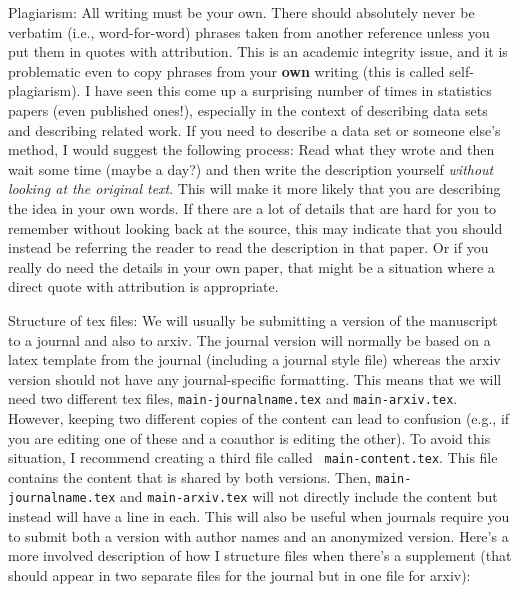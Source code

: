 \documentclass[11pt]{article}
\begin{document}
\begin{todolist}
\begin{todolist}
  \end{todolist}
\item Plagiarism:  All writing must be your own.  There should
  absolutely never be verbatim (i.e., word-for-word) phrases taken
  from another reference unless you put them in quotes with
  attribution.  This is an academic integrity issue, and it is
  problematic even to copy phrases from your {\bf own} writing (this
  is called self-plagiarism).  I have seen this come up a surprising
  number of times in statistics papers (even published ones!), especially in the context of
  describing data sets and describing related work.  If you need to describe a data set or someone
  else's method, I would suggest the following process:  Read what
  they wrote and then wait some time (maybe a day?) and then write the
  description yourself {\em without looking at the original text}.
  This will make it more likely that you are describing the idea in
  your own words.  If there are a lot of details that are hard for you
  to remember without looking back at the source, this may indicate
  that you should instead be referring the reader to read the
  description in that paper.  Or if you really do need the details in
  your own paper, that might be a situation where a direct quote with
  attribution is appropriate.
  \item Structure of tex files: We will usually be submitting a
    version of the manuscript to a journal and also to arxiv.  The
    journal version will normally be based on a latex template from
    the journal (including a journal style file) whereas the arxiv
    version should not have any journal-specific formatting.  This
    means that we will need two different tex files, {\tt main-journalname.tex}
    and {\tt main-arxiv.tex}.  However, keeping two different copies
    of the content can lead to confusion (e.g., if you are editing one
    of these and a coauthor is editing the other).  To avoid this
    situation, I recommend creating a third file called {\tt
      main-content.tex}.  This file contains the content that is
    shared by both versions.  Then,  {\tt main-journalname.tex}
    and {\tt main-arxiv.tex} will not directly include the content but
    instead will have a line \verb++ in each.
    This will also be useful when journals require you to submit both
    a version with author names and an anonymized version.
    Here's a more involved description of how I structure files when
    there's a supplement (that should appear in two separate files for
    the journal but in one file for arxiv):

\end{todolist}
\end{document}
